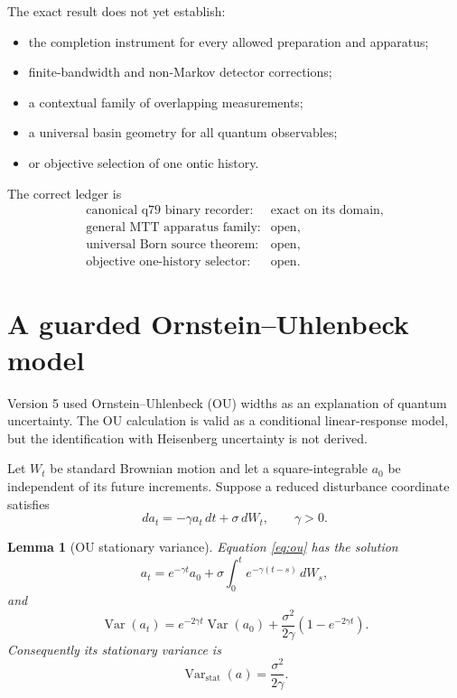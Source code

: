 \documentclass[11pt,a4paper]{article}
\newtheorem{lemma}[theorem]{Lemma}
\theoremstyle{definition}
\theoremstyle{remark}
\newcommand{\Var}{\operatorname{Var}}
\begin{document}
The exact result does not yet establish:
\begin{itemize}
\item the completion instrument for every allowed preparation and apparatus;
\item finite-bandwidth and non-Markov detector corrections;
\item a contextual family of overlapping measurements;
\item a universal basin geometry for all quantum observables;
\item or objective selection of one ontic history.
\end{itemize}

The correct ledger is
\[
\begin{array}{ll}
\text{canonical q79 binary recorder:}&\text{exact on its domain},\\
\text{general MTT apparatus family:}&\text{open},\\
\text{universal Born source theorem:}&\text{open},\\
\text{objective one-history selector:}&\text{open}.
\end{array}
\]

\section{A guarded Ornstein--Uhlenbeck model}

Version 5 used Ornstein--Uhlenbeck (OU) widths as an explanation of quantum
uncertainty. The OU calculation is valid as a conditional linear-response
model, but the identification with Heisenberg uncertainty is not derived.

Let \(W_t\) be standard Brownian motion and let a square-integrable \(a_0\)
be independent of its future increments. Suppose a reduced disturbance
coordinate satisfies
\begin{equation}
da_t=-\gamma a_t\,dt+\sigma\,dW_t,
\qquad \gamma>0.
\label{eq:ou}
\end{equation}

\begin{lemma}[OU stationary variance]
\label{lem:ou}
Equation \eqref{eq:ou} has the solution
\[
a_t=e^{-\gamma t}a_0
+\sigma\int_0^t e^{-\gamma(t-s)}\,dW_s,
\]
and
\[
\Var(a_t)
=e^{-2\gamma t}\Var(a_0)
+\frac{\sigma^2}{2\gamma}
\left(1-e^{-2\gamma t}\right).
\]
Consequently its stationary variance is
\[
\Var_{\mathrm{stat}}(a)=\frac{\sigma^2}{2\gamma}.
\]
\end{lemma}
\end{document}
